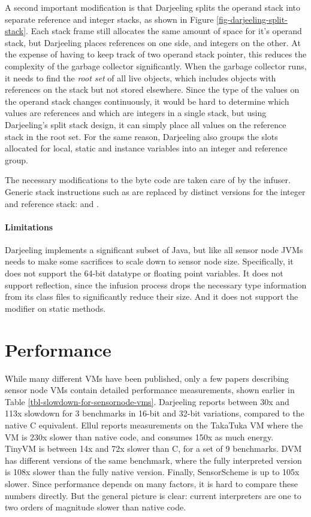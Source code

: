 A second important modification is that Darjeeling splits the operand stack into separate reference and integer stacks, as shown in Figure \ref{fig-darjeeling-split-stack}. Each stack frame still allocates the same amount of space for it's operand stack, but Darjeeling places references on one side, and integers on the other. At the expense of having to keep track of two operand stack pointer, this reduces the complexity of the garbage collector significantly. When the garbage collector runs, it needs to find the \emph{root set} of all live objects, which includes objects with references on the stack but not stored elsewhere. Since the type of the values on the operand stack changes continuously, it would be hard to determine which values are references and which are integers in a single stack, but using Darjeeling's split stack design, it can simply place all values on the reference stack in the root set. For the same reason, Darjeeling also groups the slots allocated for local, static and instance variables into an integer and reference group.

The necessary modifications to the byte code are taken care of by the infuser. Generic stack instructions such as  are replaced by distinct versions for the integer and reference stack:  and .

\paragraph{Limitations}
Darjeeling implements a significant subset of Java, but like all sensor node JVMs needs to make some sacrifices to scale down to sensor node size. Specifically, it does not support the 64-bit  datatype or floating point variables. It does not support reflection, since the infusion process drops the necessary type information from its class files to significantly reduce their size. And it does not support the  modifier on static methods.

\section{Performance}
While many different VMs have been published, only a few papers describing sensor node VMs contain detailed performance measurements, shown earlier in Table \ref{tbl-slowdown-for-sensornode-vms}. Darjeeling \cite{Brouwers:2009cj} reports between 30x and 113x slowdown for 3 benchmarks in 16-bit and 32-bit variations, compared to the native C equivalent. Ellul \cite{Ellul:2012thesis} reports measurements on the TakaTuka VM \cite{Aslam:2008} where the VM is 230x slower than native code, and consumes 150x as much energy. TinyVM \cite{Hong:2009gc} is between 14x and 72x slower than C, for a set of 9 benchmarks. DVM \cite{Balani:2006} has different versions of the same benchmark, where the fully interpreted version is 108x slower than the fully native version. Finally, SensorScheme \cite{Evers:2010ur} is up to 105x slower. Since performance depends on many factors, it is hard to compare these numbers directly. But the general picture is clear: current interpreters are one to two orders of magnitude slower than native code.

